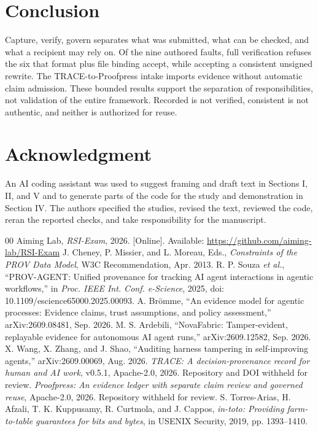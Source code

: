 \documentclass[conference]{IEEEtran}
\begin{document}
\section{Conclusion}
Capture, verify, govern separates what was submitted, what can be checked, and what a recipient may rely on. Of the nine authored faults, full verification refuses the six that format plus file binding accept, while accepting a consistent unsigned rewrite. The TRACE-to-Proofpress intake imports evidence without automatic claim admission. These bounded results support the separation of responsibilities, not validation of the entire framework. Recorded is not verified, consistent is not authentic, and neither is authorized for reuse.

\section*{Acknowledgment}
An AI coding assistant was used to suggest framing and draft text in Sections I, II, and V and to generate parts of the code for the study and demonstration in Section IV. The authors specified the studies, revised the text, reviewed the code, reran the reported checks, and take responsibility for the manuscript.

\begin{thebibliography}{00}
 Aiming Lab, \emph{RSI-Exam}, 2026. [Online]. Available: \url{https://github.com/aiming-lab/RSI-Exam}
 J. Cheney, P. Missier, and L. Moreau, Eds., \emph{Constraints of the PROV Data Model}, W3C Recommendation, Apr. 2013.
 R. P. Souza \emph{et al.}, ``PROV-AGENT: Unified provenance for tracking AI agent interactions in agentic workflows,'' in \emph{Proc. IEEE Int. Conf. e-Science}, 2025, doi: 10.1109/escience65000.2025.00093.
 A. Br\"{o}mme, ``An evidence model for agentic processes: Evidence claims, trust assumptions, and policy assessment,'' arXiv:2609.08481, Sep. 2026.
 M. S. Ardebili, ``NovaFabric: Tamper-evident, replayable evidence for autonomous AI agent runs,'' arXiv:2609.12582, Sep. 2026.
 X. Wang, X. Zhang, and J. Shao, ``Auditing harness tampering in self-improving agents,'' arXiv:2609.00069, Aug. 2026.
 \emph{TRACE: A decision-provenance record for human and AI work}, v0.5.1, Apache-2.0, 2026. Repository and DOI withheld for review.
 \emph{Proofpress: An evidence ledger with separate claim review and governed reuse}, Apache-2.0, 2026. Repository withheld for review.
 S. Torres-Arias, H. Afzali, T. K. Kuppusamy, R. Curtmola, and J. Cappos, \emph{in-toto: Providing farm-to-table guarantees for bits and bytes}, in USENIX Security, 2019, pp. 1393--1410.\end{thebibliography}
\end{document}
